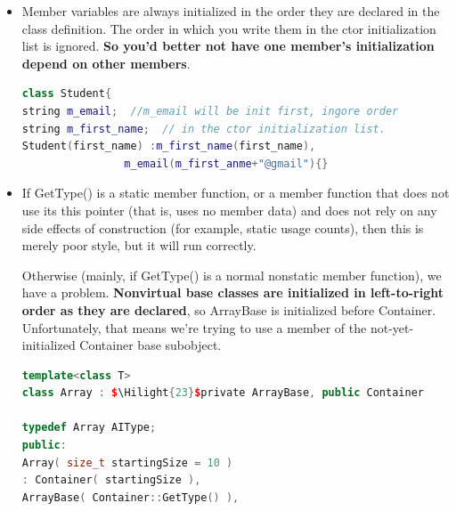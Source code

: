 \documentclass[a4paper,12pt,twoside]{book}
\newcommand{\Hilight}[1]{\makebox[0pt][l]{\color{yellow}\rule[-3pt]{#1em}{11pt}}}
\begin{document}
\begin{itemize}
\item Member variables are always initialized in the order they are declared in the class definition. The order in which you write them in the ctor initialization list is ignored.  \textbf{So you'd better not have one member's initialization depend on other members}.
\begin{lstlisting}[frame=single, language=c++]
class Student{
string m_email;  //m_email will be init first, ingore order
string m_first_name;  // in the ctor initialization list.
Student(first_name) :m_first_name(first_name),
                m_email(m_first_anme+"@gmail"){}
\end{lstlisting}


\item If GetType() is a static member function, or a member function that does not use its this
pointer (that is, uses no member data) and does not rely on any side effects of construction (for
example, static usage counts), then this is merely poor style, but it will run correctly.

Otherwise (mainly, if GetType() is a normal nonstatic member function), we have a problem.
\textbf{Nonvirtual base classes are initialized in left-to-right order as they are declared}, so ArrayBase
is initialized before Container. Unfortunately, that means we're trying to use a member of the
not-yet-initialized Container base subobject.

\begin{lstlisting}[frame=single, language=c++, mathescape=true]
template<class T>
class Array : $\Hilight{23}$private ArrayBase, public Container

typedef Array AIType;
public:
Array( size_t startingSize = 10 )
: Container( startingSize ),
ArrayBase( Container::GetType() ),
\end{lstlisting}

\end{itemize}
\end{document}
